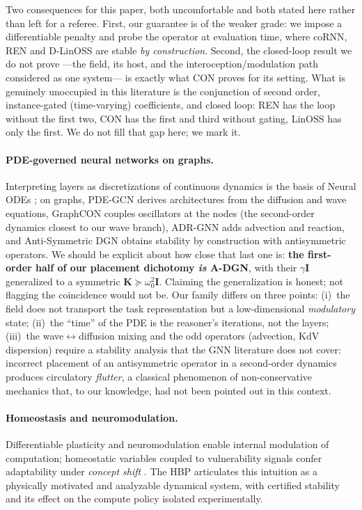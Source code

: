 \documentclass{article}
\begin{document}
Two consequences for this paper, both uncomfortable and both stated here
rather than left for a referee. First, our guarantee is of the weaker grade:
we impose a differentiable penalty and probe the operator at evaluation time,
where coRNN, REN and D-LinOSS are stable \emph{by construction}. Second, the
closed-loop result we do not prove ---the field, its host, and the
interoception/modulation path considered as one system--- is exactly what CON
proves for its setting. What is genuinely unoccupied in this literature is the
conjunction of second order, instance-gated (time-varying) coefficients, and
closed loop: REN has the loop without the first two, CON has the first and
third without gating, LinOSS has only the first. We do not fill that gap here;
we mark it.

\paragraph{PDE-governed neural networks on graphs.}
Interpreting layers as discretizations of continuous dynamics is the basis of
Neural ODEs \citep{chen2018node}; on graphs, PDE-GCN \citep{chamberlain2021grand,eliasof2021pdegcn}
derives architectures from the diffusion and wave equations, GraphCON
\citep{rusch2022graphcon} couples oscillators at the nodes (the second-order
dynamics closest to our wave branch), ADR-GNN \citep{eliasof2023adr} adds
advection and reaction, and Anti-Symmetric DGN \citep{gravina2023antisymmetric}
obtains stability by construction with antisymmetric operators. We should be
explicit about how close that last one is: \textbf{the first-order half of our
placement dichotomy \emph{is} A-DGN}, with their $\gamma\mathbf{I}$ generalized
to a symmetric $\mathbf{K}\succeq\omega_0^2\mathbf{I}$. Claiming the
generalization is honest; not flagging the coincidence would not be. Our family
differs on three points: (i)~the field does not transport the task
representation but a low-dimensional \emph{modulatory} state; (ii)~the ``time''
of the PDE is the reasoner's iterations, not the layers; (iii)~the
wave$\leftrightarrow$diffusion mixing and the odd operators (advection, KdV
dispersion) require a stability analysis that the GNN literature does not cover:
incorrect placement of an antisymmetric operator in a second-order dynamics
produces circulatory \emph{flutter}, a classical phenomenon of non-conservative
mechanics \citep{ziegler1952,merkin1997,kirillov2013} that, to our knowledge, had
not been pointed out in this context.

\paragraph{Homeostasis and neuromodulation.}
Differentiable plasticity and neuromodulation
\citep{miconi2018plasticity,miconi2019backpropamine} enable internal modulation
of computation; homeostatic variables coupled to vulnerability signals confer
adaptability under \emph{concept shift} \citep{man2022homeostatic}. The HBP
articulates this intuition as a physically motivated and analyzable dynamical
system, with certified stability and its effect on the compute policy isolated
experimentally.
\end{document}
